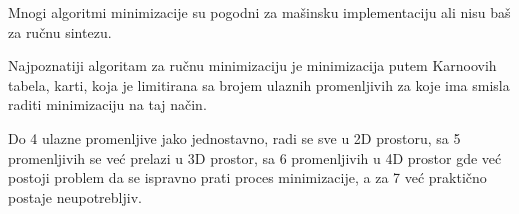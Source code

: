 \begin{frame}[label=02-s033]
Mnogi algoritmi minimizacije su pogodni za mašinsku implementaciju ali nisu baš za ručnu sintezu.

Najpoznatiji algoritam za ručnu minimizaciju je minimizacija putem Karnoovih tabela, karti, koja je limitirana sa brojem ulaznih promenljivih za koje ima smisla raditi minimizaciju na taj način.

Do 4 ulazne promenljive jako jednostavno, radi se sve u 2D prostoru, sa 5 promenljivih se već prelazi u 3D prostor, sa 6 promenljivih u 4D prostor gde već postoji problem da se ispravno prati proces minimizacije, a za 7 već praktično postaje neupotrebljiv.
\end{frame}
